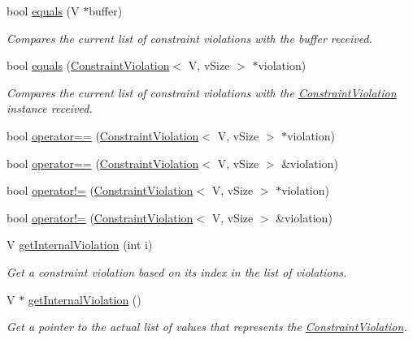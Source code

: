 \begin{DoxyCompactItemize}
bool \hyperlink{structConstraintViolation_a163197175eff749bf4b026c076961120}{equals} (V $\ast$buffer)
\begin{DoxyCompactList}\small\item\em Compares the current list of constraint violations with the buffer received. \end{DoxyCompactList}\item 
bool \hyperlink{structConstraintViolation_ae3f2f69ecc051cde999037c6c7cce276}{equals} (\hyperlink{structConstraintViolation}{Constraint\+Violation}$<$ V, v\+Size $>$ $\ast$violation)
\begin{DoxyCompactList}\small\item\em Compares the current list of constraint violations with the \hyperlink{structConstraintViolation}{Constraint\+Violation} instance received. \end{DoxyCompactList}\item 
bool \hyperlink{structConstraintViolation_a4924e949e9aee8e84cdafea54f2851b9}{operator==} (\hyperlink{structConstraintViolation}{Constraint\+Violation}$<$ V, v\+Size $>$ $\ast$violation)
\item 
bool \hyperlink{structConstraintViolation_aa1e045de24917458b5414675d1473d3d}{operator==} (\hyperlink{structConstraintViolation}{Constraint\+Violation}$<$ V, v\+Size $>$ \&violation)
\item 
bool \hyperlink{structConstraintViolation_abd1a4af7bc87614609e83b69e43732ff}{operator!=} (\hyperlink{structConstraintViolation}{Constraint\+Violation}$<$ V, v\+Size $>$ $\ast$violation)
\item 
bool \hyperlink{structConstraintViolation_a746b126ea8c52c2e8cf479280ba28d56}{operator!=} (\hyperlink{structConstraintViolation}{Constraint\+Violation}$<$ V, v\+Size $>$ \&violation)
\item 
V \hyperlink{structConstraintViolation_a28a71d2bb7a090f92824ae6dadcec646}{get\+Internal\+Violation} (int i)
\begin{DoxyCompactList}\small\item\em Get a constraint violation based on its index in the list of violations. \end{DoxyCompactList}\item 
V $\ast$ \hyperlink{structConstraintViolation_a2cd06f4514a4ebda42d90b3b9b1a6612}{get\+Internal\+Violation} ()
\begin{DoxyCompactList}\small\item\em Get a pointer to the actual list of values that represents the \hyperlink{structConstraintViolation}{Constraint\+Violation}. \end{DoxyCompactList}\item 

\end{DoxyCompactItemize}
